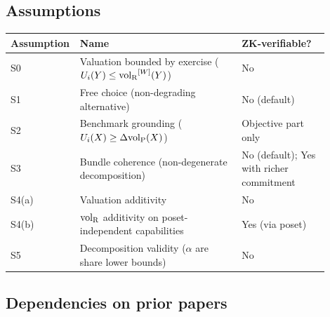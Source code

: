 \subsection{Assumptions}

\begin{center}
\small
\begin{tabular}{@{}>{\raggedright\arraybackslash}p{0.13\linewidth}
                  >{\raggedright\arraybackslash}p{0.50\linewidth}
                  >{\raggedright\arraybackslash}p{0.27\linewidth}@{}}
\toprule
\textbf{Assumption} & \textbf{Name} & \textbf{ZK-verifiable?} \\
\midrule
S0 & Valuation bounded by exercise
  ($U_i(Y) \leq {\operatorname{vol}_{\mathrm{R}}}^{[W]}(Y)$) & No \\
S1 & Free choice (non-degrading alternative) & No (default) \\
S2 & Benchmark grounding ($U_i(X) \geq \Delta{\operatorname{vol}_{\mathrm{P}}}(X)$)
  & Objective part only \\
S3 & Bundle coherence (non-degenerate decomposition)
  & No (default); Yes with richer commitment \\
S4(a) & Valuation additivity & No \\
S4(b) & ${\operatorname{vol}_{\mathrm{R}}}$ additivity on poset-independent capabilities
  & Yes (via poset) \\
S5 & Decomposition validity
  ($\alpha$ are share lower bounds) & No \\
\bottomrule
\end{tabular}
\end{center}

\subsection{Dependencies on prior papers}


